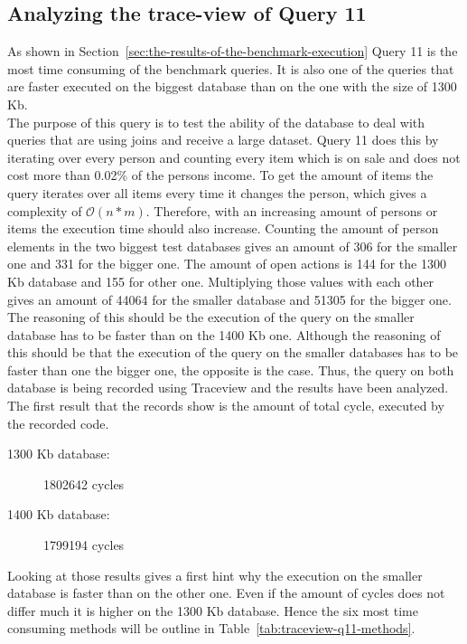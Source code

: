 \subsection*{Analyzing the trace-view of Query 11}
\label{sec:analyzing-the-trace-view-of-query-2}
As shown in Section~\ref{sec:the-results-of-the-benchmark-execution} Query 11 is the most time consuming of the benchmark queries.
It is also one of the queries that are faster executed on the biggest database than on the one with the size of 1300 Kb.\\
The purpose of this query is to test the ability of the database to deal with queries that are using joins and receive a large dataset.
Query 11 does this by iterating over every person and counting every item which is on sale and does not cost more than 0.02\% of the persons income.
To get the amount of items the query iterates over all items every time it changes the person, which gives a complexity of $\mathcal O(n*m)$.
Therefore, with an increasing amount of persons or items the execution time should also increase.
Counting the amount of person elements in the two biggest test databases gives an amount of 306 for the smaller one and 331 for the bigger one.
The amount of open actions is 144 for the 1300 Kb database and 155 for other one.
Multiplying those values with each other gives an amount of 44064 for the smaller database and 51305 for the bigger one.
The reasoning of this should be the execution of the query on the smaller database has to be faster than on the 1400 Kb one.
Although the reasoning of this should be that the execution of the query on the smaller databases has to be faster than one the bigger one, the opposite is the case.
Thus, the query on both database is being recorded using Traceview and the results have been analyzed.\\
The first result that the records show is the amount of total cycle, executed by the recorded code.
\begin{description}
  \item[1300 Kb database:] 1802642 cycles
  \item[1400 Kb database:] 1799194 cycles
\end{description}
Looking at those results gives a first hint why the execution on the smaller database is faster than on the other one.
Even if the amount of cycles does not differ much it is higher on the 1300 Kb database.
Hence the six most time consuming methods will be outline in Table~\ref{tab:traceview-q11-methods}.\\
